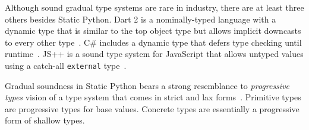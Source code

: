 \documentclass[english,cleveref,submission]{programming}
\newcommand{\SP}{Static Python}
\newcommand{\code}[1]{\texttt{#1}}
\begin{document}
Although sound gradual type systems are rare in industry, there are at
least three others besides \SP{}.
Dart 2 is a nominally-typed language with a dynamic type that is similar
to the top object type but allows implicit downcasts to every other type~\cite{dart-types}.
C\# includes a dynamic type that defers type checking until runtime~\cite{bmt-ecoop-2010}.
JS++ is a sound type system for JavaScript that allows untyped values
using a catch-all \code{external} type~\cite{jspp}.

Gradual soundness in \SP{} bears a strong resemblance to \emph{progressive types} vision
of a type system that comes in strict and lax forms~\cite{pqk-onward-2012}.
Primitive types are progressive types for base values.
Concrete types are essentially a progressive form of shallow types.


\end{document}
